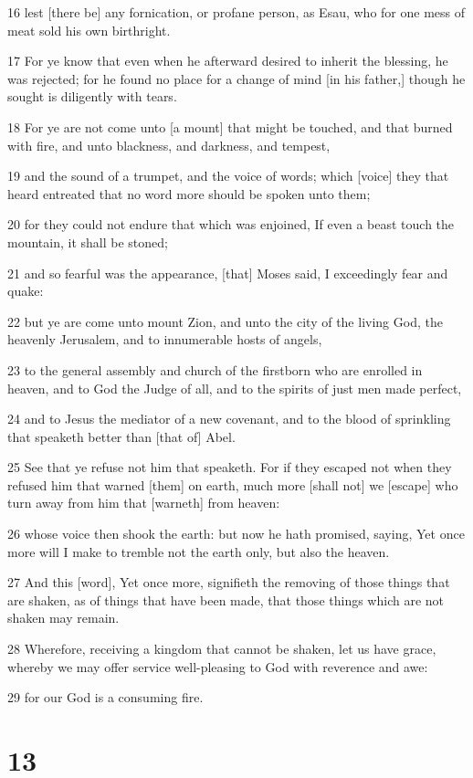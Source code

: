 \par 16 lest [there be] any fornication, or profane person, as Esau, who for one mess of meat sold his own birthright.
\par 17 For ye know that even when he afterward desired to inherit the blessing, he was rejected; for he found no place for a change of mind [in his father,] though he sought is diligently with tears.
\par 18 For ye are not come unto [a mount] that might be touched, and that burned with fire, and unto blackness, and darkness, and tempest,
\par 19 and the sound of a trumpet, and the voice of words; which [voice] they that heard entreated that no word more should be spoken unto them;
\par 20 for they could not endure that which was enjoined, If even a beast touch the mountain, it shall be stoned;
\par 21 and so fearful was the appearance, [that] Moses said, I exceedingly fear and quake:
\par 22 but ye are come unto mount Zion, and unto the city of the living God, the heavenly Jerusalem, and to innumerable hosts of angels,
\par 23 to the general assembly and church of the firstborn who are enrolled in heaven, and to God the Judge of all, and to the spirits of just men made perfect,
\par 24 and to Jesus the mediator of a new covenant, and to the blood of sprinkling that speaketh better than [that of] Abel.
\par 25 See that ye refuse not him that speaketh. For if they escaped not when they refused him that warned [them] on earth, much more [shall not] we [escape] who turn away from him that [warneth] from heaven:
\par 26 whose voice then shook the earth: but now he hath promised, saying, Yet once more will I make to tremble not the earth only, but also the heaven.
\par 27 And this [word], Yet once more, signifieth the removing of those things that are shaken, as of things that have been made, that those things which are not shaken may remain.
\par 28 Wherefore, receiving a kingdom that cannot be shaken, let us have grace, whereby we may offer service well-pleasing to God with reverence and awe:
\par 29 for our God is a consuming fire.

\chapter{13}

